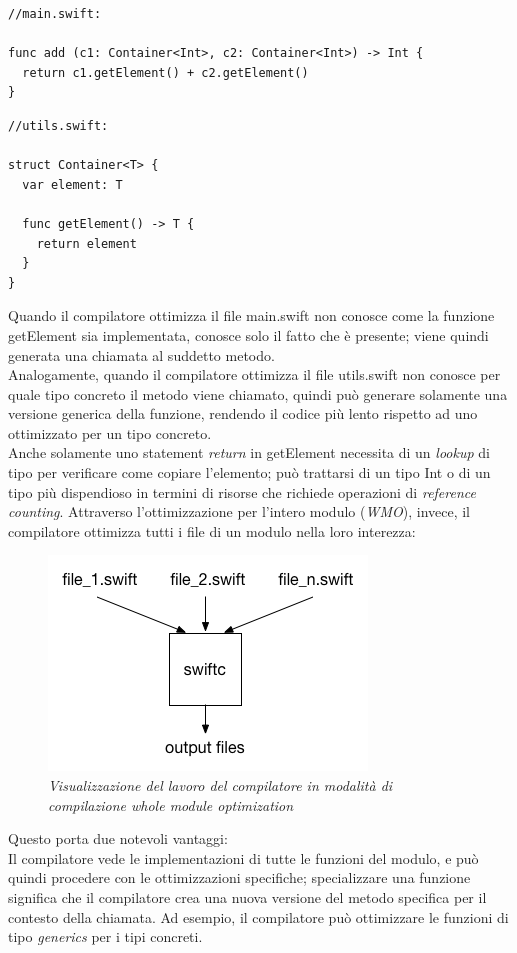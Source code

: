 \begin{lstlisting}
//main.swift:

func add (c1: Container<Int>, c2: Container<Int>) -> Int {
  return c1.getElement() + c2.getElement()
}
\end{lstlisting}
\begin{lstlisting}
//utils.swift:

struct Container<T> {
  var element: T

  func getElement() -> T {
    return element
  }
}
\end{lstlisting}
Quando il compilatore ottimizza il file main.swift non conosce come la funzione getElement sia implementata, conosce solo il fatto che è presente; viene quindi generata una chiamata al suddetto metodo.\\
Analogamente, quando il compilatore ottimizza il file utils.swift non conosce per quale tipo concreto il metodo viene chiamato, quindi può generare solamente una versione generica della funzione, rendendo il codice più lento rispetto ad uno ottimizzato per un tipo concreto.\\
Anche solamente uno statement \textit{return} in getElement necessita di un \textit{lookup} di tipo per verificare come copiare l'elemento; può trattarsi di un tipo Int o di un tipo più dispendioso in termini di risorse che richiede operazioni di \textit{reference counting}.\newpage
Attraverso l'ottimizzazione per l'intero modulo (\textit{WMO}), invece, il compilatore ottimizza tutti i file di un modulo nella loro interezza: 
\begin{figure}[H]
      \centering
      \includegraphics[scale=0.80]{immagini/wmo.png}
            \vspace{0.8cm}
            \caption{\textit{Visualizzazione del lavoro del compilatore in modalità di compilazione whole module optimization}}
\end{figure}
Questo porta due notevoli vantaggi:\\
Il compilatore vede le implementazioni di tutte le funzioni del modulo, e può quindi procedere con le ottimizzazioni specifiche; specializzare una funzione significa che il compilatore crea una nuova versione del metodo specifica per il contesto della chiamata. Ad esempio, il compilatore può ottimizzare le funzioni di tipo \textit{generics} per i tipi concreti.\\
